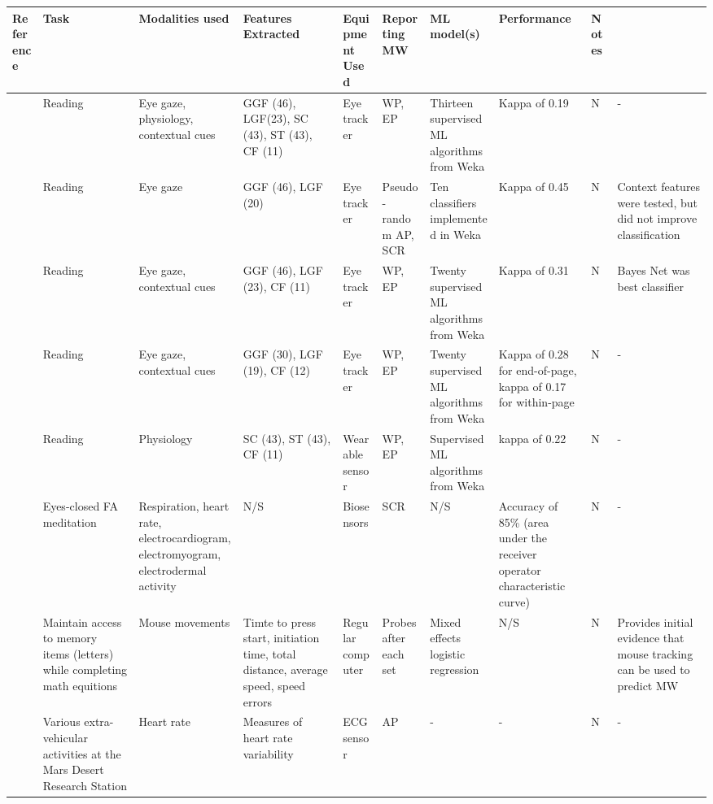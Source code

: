 \begin{xtabular}{p{25mm}p{30mm}p{30mm}p{22mm}p{38mm}p{22mm}p{33mm}p{22mm}p{35mm}}
  \toprule
        Reference & Task & Modalities used & Features Extracted \footnotemark[1] & Equipment Used & Reporting MW \footnotemark[2] & ML model(s) & Performance & Notes\\
  \midrule
  \midrule
  \midrule
\cite{Bixler2015AutomaticPhysiology} & Reading & Eye gaze, physiology, contextual cues & GGF (46), LGF(23), SC (43), ST (43), CF (11) & Eye tracker & WP, EP & Thirteen supervised ML algorithms from Weka & Kappa of 0.19 & N & -\\ \midrule 
\cite{Bixler2015AutomaticAwareness} & Reading & Eye gaze & GGF (46), LGF (20) & Eye tracker & Pseudo-random AP, SCR & Ten classifiers implemented in Weka & Kappa of 0.45 & N & Context features were tested, but did not improve classification\\ \midrule 
\cite{Bixler2016AutomaticReading} & Reading & Eye gaze, contextual cues & GGF (46), LGF (23), CF (11) & Eye tracker & WP, EP & Twenty supervised ML algorithms from Weka & Kappa of 0.31 & N & Bayes Net was best classifier\\ \midrule
\cite{Bixler2014TowardWandering} & Reading & Eye gaze, contextual cues & GGF (30), LGF (19), CF (12) & Eye tracker & WP, EP & Twenty supervised ML algorithms from Weka & Kappa of 0.28 for end-of-page, kappa of 0.17 for within-page & N & -\\ \midrule 
\cite{Blanchard2014AutomatedLearning} & Reading & Physiology & SC (43), ST (43), CF (11) & Wearable sensor & WP, EP & Supervised ML algorithms from Weka & kappa of 0.22 & N & -\\ \midrule
\cite{Cheetham2016AutomatedApplication} & Eyes-closed FA meditation & Respiration, heart rate, electrocardiogram, electromyogram, electrodermal activity & N/S & Biosensors & SCR & N/S & Accuracy of 85\% (area under the receiver operator characteristic curve) & N & -\\\hline 
\cite{DaSilva2018WanderingWandering} & Maintain access to memory items (letters) while completing math equitions & Mouse movements & Timte to press start, initiation time, total distance, average speed, speed errors & Regular computer & Probes after each set & Mixed effects logistic regression & N/S & N & Provides initial evidence that mouse tracking can be used to predict MW\\\hline 
\cite{Gontier2016HowEnvironment} & Various extra-vehicular activities at the Mars Desert Research Station & Heart rate & Measures of heart rate variability & ECG sensor & AP & - & - & N & -\\ \midrule

\end{xtabular}
